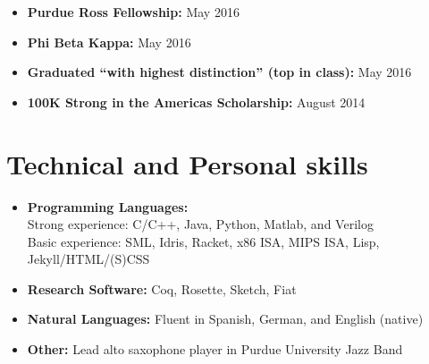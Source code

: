 \documentclass[10pt,a4paper,sans]{moderncv}        %
\begin{document}
\begin{itemize}


\item \textbf{Purdue Ross Fellowship:} May 2016
\vspace{4pt}
\item \textbf{Phi Beta Kappa:} May 2016
\vspace{4pt}
\item \textbf{Graduated ``with highest distinction'' (top in class):} May 2016
\vspace{4pt}
\item \textbf{100K Strong in the Americas Scholarship:} August 2014

\end{itemize}

\section{Technical and Personal skills}

\vspace{4pt}

\begin{itemize}

\item \textbf{Programming Languages:} \\
  Strong experience: C/C++, Java, Python, Matlab, and Verilog \\ Basic
  experience: SML, Idris, Racket, x86 ISA, MIPS ISA, Lisp,
  Jekyll/HTML/(S)CSS

\vspace{4pt}

\item \textbf{Research Software:} Coq, Rosette, Sketch, Fiat

\vspace{4pt}

\item \textbf{Natural Languages:} Fluent in Spanish, German, and English (native)

\vspace{4pt}

\item \textbf{Other:} Lead alto saxophone player in Purdue University
  Jazz Band

\end{itemize}

\end{document}
